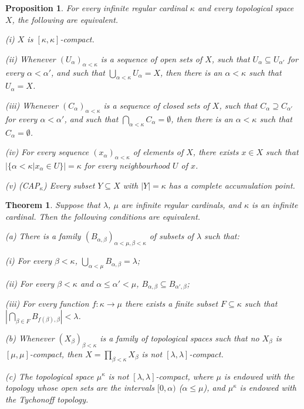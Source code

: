 \documentclass[12pt]{amsart}
\newtheorem{thm}[theorem]{Theorem}
\newtheorem{prop}[theorem]{Proposition}
\theoremstyle{definition}
\theoremstyle{remark}
\begin{document}
\begin{prop}\label{regcomp}
For every infinite regular cardinal $ \kappa $ and every topological
space $X$, the following are equivalent. 

(i) $X$ is $[ \kappa  , \kappa   ]$-compact.

(ii) Whenever $(U_ \alpha )_{\alpha < \kappa } $
is a sequence of open sets of $X$, such that 
$ U_ \alpha \subseteq U_{\alpha'}$ for every $ \alpha<\alpha' $,
and such that $\bigcup_{ \alpha < \kappa } U_ \alpha =X$,
then there is an $ \alpha < \kappa $ such that $ U_ \alpha =X$.

(iii) Whenever $(C_ \alpha )_{\alpha < \kappa } $
is a sequence of closed sets of $X$, such that 
$ C_ \alpha \supseteq C_{\alpha'}$ for every $ \alpha<\alpha' $,
and such that $\bigcap_{ \alpha < \kappa } C_ \alpha =\emptyset$,
then there is an $ \alpha < \kappa $ such that $ C_ \alpha =\emptyset$.
 
(iv) For every sequence $(x_ \alpha )_{\alpha < \kappa } $
 of elements of $X$, there exists $x \in X$ such that 
$ |\{ \alpha < \kappa | x_ \alpha \in U \}|=  \kappa $
for every neighbourhood $U$ of $x$. 

(v) (CAP$_\kappa $) Every subset $Y\subseteq X$ with $|Y|=\kappa $ has a complete
accumulation point.
\end{prop} 


\begin{thm}\label{lmkprod} 
Suppose that  $ \lambda $, $\mu$  are infinite regular cardinals, 
and $\kappa $ is an infinite cardinal.  
Then the following conditions are equivalent.

\smallskip

(a) There is a family $ (B_{ \alpha , \beta }) _{ \alpha<\mu , \beta<\kappa}  $ 
of subsets of $ \lambda $ such that:

(i) For every $ \beta<\kappa$, $\bigcup _{ \alpha<\mu } B_{ \alpha , \beta  } = \lambda$;

(ii) For every $ \beta<\kappa$ and $ \alpha \leq \alpha ' < \mu  $, 
$ B_{ \alpha , \beta } \subseteq B_{ \alpha' , \beta }$;

(iii) For every function $f : \kappa  \to \mu $ there exists a finite subset
$F \subseteq \kappa  $ such that 
$|\bigcap _{\beta \in F} B_{ f( \beta) , \beta }| < \lambda $.   

\smallskip

(b)
Whenever
$(X_ \beta ) _{ \beta < \kappa }$ is a family of topological spaces
such that  no $X_ \beta $ is 
$[ \mu, \mu]$-compact,
then $X=\prod_{ \beta < \kappa } X_ \beta $
 is not  $[ \lambda , \lambda ]$-compact.

\smallskip

(c) The topological space $ \mu^ \kappa $ is not
$[ \lambda , \lambda ]$-compact, where $ \mu$
is endowed with the topology whose open sets are the
intervals $ [0, \alpha) $ ($ \alpha \leq \mu$), and 
$ \mu^ \kappa $ is endowed with the Tychonoff topology. 
\end{thm} 
 
\end{document}
